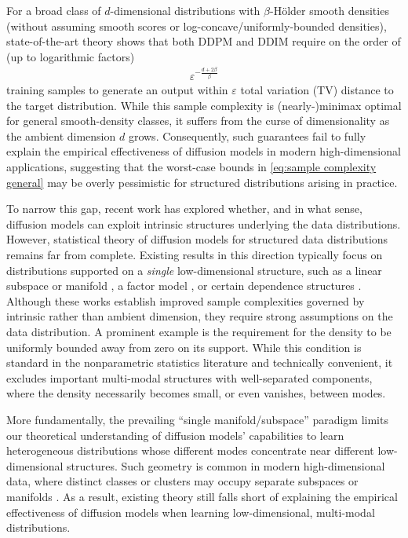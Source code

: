 \documentclass{article}
\newcommand{\veps}{\varepsilon}
\theoremstyle{plain}
\theoremstyle{remark}
\begin{document}
For a broad class of $d$-dimensional distributions with $\beta$-H\"older smooth densities (without assuming smooth scores or log-concave/uniformly-bounded densities), state-of-the-art theory shows that both DDPM \citep{zhang2024minimaxoptimalityscorebaseddiffusion} and DDIM \citep{cai2025minimaxoptimalityprobabilityflow} require on the order of  (up to logarithmic factors)
\begin{align}\label{eq:sample complexity general}
\veps^{-\frac{d+2\beta}{\beta}}
\end{align}
training samples to generate an output within $\veps$ total variation (TV) distance to the target distribution.
While this sample complexity is (nearly-)minimax optimal for general smooth-density classes, it suffers from the curse of dimensionality as the ambient dimension $d$ grows. Consequently, such guarantees fail to fully explain the empirical effectiveness of diffusion models in modern high-dimensional applications, suggesting that the worst-case bounds in \eqref{eq:sample complexity general} may be overly pessimistic for structured distributions arising in practice.

To narrow this gap, recent work has explored whether, and in what sense, diffusion models can exploit intrinsic structures underlying the data distributions. 
However, statistical theory of diffusion models for structured data distributions remains far from complete.
Existing results in this direction typically focus on distributions supported on a \textit{single} low-dimensional structure, such as a linear subspace or manifold \citep{chen2023scoreapproximationestimationdistribution,tang24a,azangulov2025convergencediffusionmodelsmanifold,yakovlev2025generalization}, a factor model \citep{chen2025diffusion}, or certain dependence structures \citep{fan2025optimalestimationfactorizabledensity}.
Although these works establish improved sample complexities governed by intrinsic rather than ambient dimension, they require strong assumptions on the data distribution. A prominent example is the requirement for the density to be uniformly bounded away from zero on its support.
While this condition is standard in the nonparametric statistics literature and technically convenient, it excludes important multi-modal structures with well-separated components, where the density necessarily becomes small, or even vanishes, between modes.

More fundamentally, the prevailing ``single manifold/subspace'' paradigm limits our theoretical understanding of diffusion models' capabilities to 
learn heterogeneous distributions whose different modes concentrate near different low-dimensional structures. Such geometry is common in modern high-dimensional data, where distinct classes or clusters may occupy separate subspaces or manifolds \citep{Vidal2010ATO,brown2022verifying}.
As a result, existing theory still falls short of explaining the empirical effectiveness of diffusion models when learning low-dimensional, multi-modal distributions.
 
\end{document}
